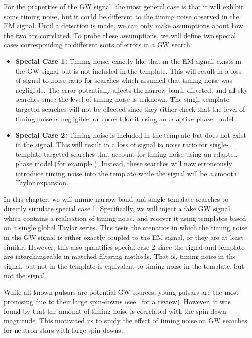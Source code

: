\documentclass[../full_thesis/full_thesis.tex]{subfiles}
\begin{document}
For the properties of the GW signal, the most general case is that it will
exhibit some timing noise, but it could be different to the timing noise
observed in the EM signal. Until a detection is made, we can only make
assumptions about how the two are correlated. To probe these assumptions, we
will define two special cases corresponding to different sorts of errors in a
GW search:
\begin{itemize}

\item {\bf Special Case 1:} Timing noise, exactly like that in the EM signal,
exists in the GW signal but is not included in the template. This will result
in a loss of signal to noise ratio for searches which assumed that timing noise
was negligible. The error potentially affects the narrow-band, directed, and
all-sky searches since the level of timing noise is unknown. The single
template targeted searches will not be effected since they either check that
the level of timing noise is negligible, or correct for it using an adaptive
phase model.


\item {\bf Special Case 2:} Timing noise is included in the template but does
    not exist in the signal. This will result in a loss of signal to noise
    ratio for single-template targeted searches that account for timing noise
    using an adapted phase model (for example \citet{abbott2008beating}).  Instead,
    these searches will now erroneously introduce timing noise into the
    template while the signal will be a smooth Taylor expansion.

\end{itemize}

In this chapter, we will mimic narrow-band and single-template searches to
directly simulate special case 1. Specifically, we will inject a fake GW signal
which contains a realisation of timing noise, and recover it using templates
based on a single global Taylor series. This tests the scenarios in which the
timing noise in the GW signal is either exactly coupled to the EM signal, or
they are at least similar.  However, this also quantifies special case 2 since
the signal and template are interchangeable in matched filtering methods.  That
is, timing noise in the signal, but not in the template is equivalent to timing
noise in the template, but not the signal.

While all known pulsars are potential GW sources, young pulsars are the most
promising due to their large spin-downs (see~\citet{abbott2010searches} for a review).
However, it was found by \citet{Hobbs2010} that the amount of timing noise is
correlated with the spin-down  magnitude. This motivated us to study the effect
of timing noise on GW searches for neutron stars with large spin-downs.
\end{document}
